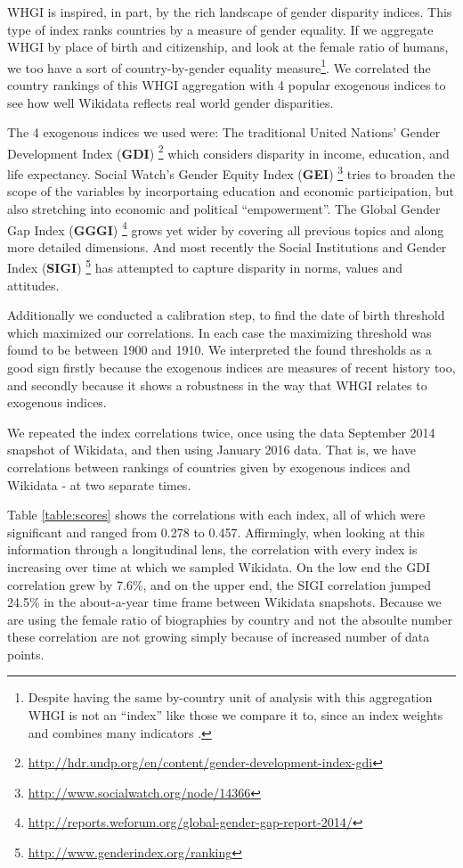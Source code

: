\documentclass{sig-alternate-05-2015}
\begin{document}
WHGI is inspired, in part, by the rich landscape of gender disparity indices. This type of index ranks countries by a measure of gender equality. If we aggregate WHGI by place of birth and citizenship, and look at the female ratio of humans, we too have a sort of country-by-gender equality measure\footnote{Despite having the same by-country unit of analysis with this aggregation WHGI is not an ``index'' like those we compare it to, since an index weights and combines many indicators \cite{rossi_handbook_1980}. }.  We correlated the country rankings of this WHGI aggregation with 4 popular exogenous indices to see how well Wikidata reflects real world gender disparities.

The 4 exogenous indices we used were: The traditional United Nations' Gender Development Index (\textbf{GDI})  \footnote{\url{http://hdr.undp.org/en/content/gender-development-index-gdi}} which considers disparity in income, education, and life expectancy. Social Watch's Gender Equity Index (\textbf{GEI}) \footnote{\url{http://www.socialwatch.org/node/14366}} tries to broaden the scope of the variables by incorportaing education and economic participation, but also stretching into economic and political ``empowerment''. The Global Gender Gap Index (\textbf{GGGI}) \footnote{\url{http://reports.weforum.org/global-gender-gap-report-2014/}} grows yet wider by covering all previous topics and along more detailed dimensions. And most recently  the Social Institutions and Gender Index (\textbf{SIGI}) \footnote{\url{http://www.genderindex.org/ranking}} has attempted to capture disparity in norms, values and attitudes.

Additionally we conducted a calibration step, to find the date of birth threshold which maximized our correlations. In each case the maximizing threshold was found to be between 1900 and 1910. We interpreted the found thresholds as a good sign firstly because the exogenous indices are measures of recent history too, and secondly because it shows a robustness in the way that WHGI relates to exogenous indices.

We repeated the index correlations twice, once using the data  September 2014 snapshot of Wikidata, and then using January 2016 data. That is, we have correlations between rankings of countries given by exogenous indices and Wikidata - at two separate times.

Table \ref{table:scores} shows the correlations with each index, all of which were significant and ranged from 0.278 to 0.457. Affirmingly, when looking at this information through a longitudinal lens, the correlation with every index is increasing over time at which we sampled Wikidata. On the low end the GDI correlation grew by 7.6\%, and on the upper end, the SIGI correlation jumped 24.5\% in the about-a-year time frame between Wikidata snapshots. Because we are using the  female ratio of biographies by country and not the absoulte number these correlation are not growing simply because of increased number of data points.
\end{document}

